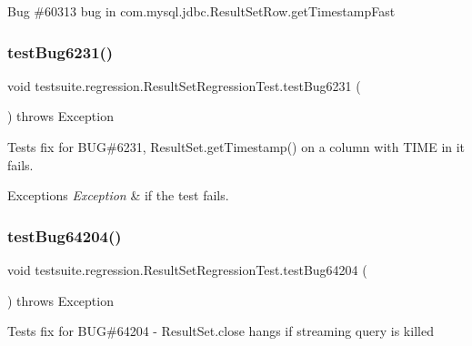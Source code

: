 Bug \#60313 bug in com.\+mysql.\+jdbc.\+Result\+Set\+Row.\+get\+Timestamp\+Fast \mbox{\label{classtestsuite_1_1regression_1_1_result_set_regression_test_aeb09775b50784baa772c121c33812f23}} 
\subsubsection{\texorpdfstring{test\+Bug6231()}{testBug6231()}}
{\footnotesize\ttfamily void testsuite.\+regression.\+Result\+Set\+Regression\+Test.\+test\+Bug6231 (\begin{DoxyParamCaption}{ }\end{DoxyParamCaption}) throws Exception}

Tests fix for B\+UG\#6231, Result\+Set.\+get\+Timestamp() on a column with T\+I\+ME in it fails.


\begin{DoxyExceptions}{Exceptions}
{\em Exception} & if the test fails. \\
\hline
\end{DoxyExceptions}
\mbox{\label{classtestsuite_1_1regression_1_1_result_set_regression_test_a4c82635b5ff90ca43310f0523bf0b8a5}} 
\subsubsection{\texorpdfstring{test\+Bug64204()}{testBug64204()}}
{\footnotesize\ttfamily void testsuite.\+regression.\+Result\+Set\+Regression\+Test.\+test\+Bug64204 (\begin{DoxyParamCaption}{ }\end{DoxyParamCaption}) throws Exception}

Tests fix for B\+UG\#64204 -\/ Result\+Set.\+close hangs if streaming query is killed


